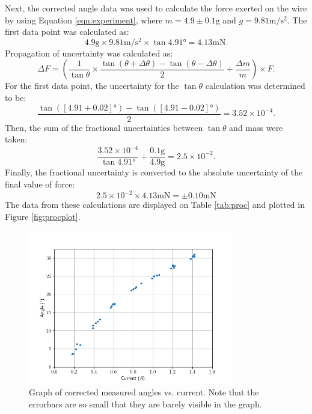 Next, the corrected angle data was used to calculate the force exerted on the wire by using Equation \eqref{eqn:experiment}, where $m = 4.9\pm0.1\si{\gram}$ and $g = 9.81\si{\meter\per\second\squared}$. The first data point was calculated as:
\begin{equation*}
	4.9\si{\gram} \times 9.81\si{\meter\per\second\squared} \times \tan 4.91\si{\degree} = 4.13\si{\milli\newton} \text{.}
\end{equation*}
Propagation of uncertainty was calculated as:
\begin{equation*}
	\Delta F = \left( \frac{1}{\tan\theta} \times \frac{\tan(\theta + \Delta\theta) - \tan(\theta - \Delta\theta)}{2} + \frac{\Delta m}{m} \right) \times F \text{.}
\end{equation*}
For the first data point, the uncertainty for the $\tan\theta$ calculation was determined to be:
\begin{equation*}
	\frac{\tan([4.91 + 0.02]\si{\degree}) - \tan([4.91 - 0.02]\si{\degree})}{2} = 3.52\times10^{-4} \text{.}
\end{equation*}
Then, the sum of the fractional uncertainties between $\tan\theta$ and mass were taken:
\begin{equation*}
	\frac{3.52\times10^{-4}}{\tan 4.91\si{\degree}} + \frac{0.1\si{\gram}}{4.9\si{\gram}} = 2.5\times10^{-2} \text{.}
\end{equation*}
Finally, the fractional uncertainty is converted to the absolute uncertainty of the final value of force:
\begin{equation*}
	2.5\times10^{-2} \times 4.13\si{\milli\newton} = \pm 0.10\si{\milli\newton}
\end{equation*}
The data from these calculations are displayed on Table \ref{tab:proc} and plotted in Figure \ref{fig:procplot}.

\begin{figure}[t!]
	\centering
	\includegraphics[width=0.8\textwidth]{figures/rawplot.png}
	\caption{Graph of corrected measured angles vs. current. Note that the errorbars are so small that they are barely visible in the graph.}
	\label{fig:rawplot}
\end{figure}


